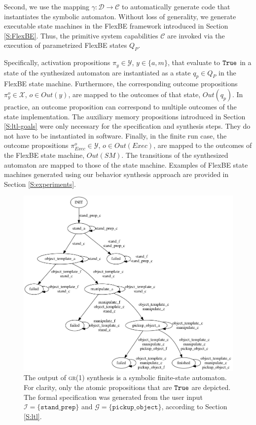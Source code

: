 Second, we use the mapping $\gamma: \mathcal{D} \rightarrow \mathcal{C}$ to automatically generate code that instantiates the symbolic automaton.
Without loss of generality, we generate executable state machines in the FlexBE framework introduced in Section \ref{S:FlexBE}.
Thus, the primitive system capabilities $\mathcal{C}$ are invoked via the execution of parametrized FlexBE states $Q_P$.

Specifically, activation propositions $\pi_y \in \mathcal{Y}$, $y \in \{ a, m \}$, that evaluate to $\mathtt{True}$ in a state of the synthesized automaton are instantiated as a state $q_p \in Q_P$ in the FlexBE state machine.
Furthermore, the corresponding outcome propositions $\pi_y^o \in \mathcal{X}$, $o \in Out(y)$, are mapped to the outcomes of that state, $Out(q_p)$.
In practice, an outcome proposition can correspond to multiple outcomes of the state implementation.
The auxiliary memory propositions introduced in Section \ref{S:ltl-goals} were only necessary for the specification and synthesis steps.
They do not have to be instantiated in software.
Finally, in the finite run case, the outcome propositions $\pi_{Exec}^o \in \mathcal{Y}$, $o \in Out(Exec)$, are mapped to the outcomes of the FlexBE state machine, $Out(SM)$.
The transitions of the synthesized automaton are mapped to those of the state machine.
Examples of FlexBE state machines generated using our behavior synthesis approach are provided in Section \ref{S:experiments}.

\begin{figure}[t]
\centering
\includegraphics[width=0.95\columnwidth,clip]{./img/synthesized_automaton.png}
\caption{
	The output of \textsc{gr(1)} synthesis is a symbolic finite-state automaton.
	For clarity, only the atomic propositions that are $\mathtt{True}$ are depicted.
	The formal specification was generated from the user input $\mathcal{I} = \{ \mathtt{stand\_prep} \}$ and $\mathcal{G} = \{ \mathtt{pickup\_object} \}$, according to Section \ref{S:ltl}.
}
\label{Fig:SynthesizedAutomaton}
\end{figure}

